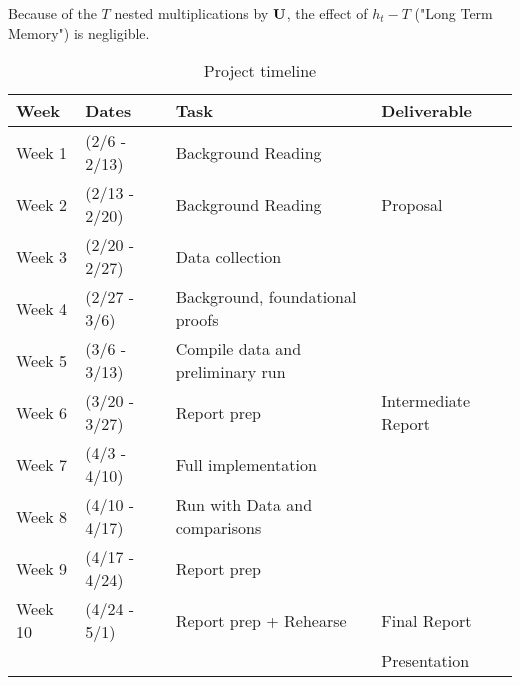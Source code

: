 Because of the $T$ nested multiplications by $\textbf U$, the effect of $h_t-T$ ("Long Term Memory") is negligible.

\begin{table*}[t]
  \caption{Project timeline}
  \label{tab:freq}
  \begin{tabular}{llll}
    \toprule
    Week & Dates & Task & Deliverable\\
    \midrule
    Week 1 & (2/6   - 2/13) & Background Reading & \\
    Week 2 & (2/13  - 2/20) & Background Reading & Proposal\\
    Week 3 & (2/20  - 2/27) & Data collection & \\
    Week 4 & (2/27  - 3/6)  & Background, foundational proofs & \\
    Week 5 & (3/6   - 3/13) & Compile data and preliminary run & \\
    Week 6 & (3/20  - 3/27) & Report prep & Intermediate Report\\
    Week 7 & (4/3   - 4/10) & Full implementation & \\
    Week 8 & (4/10  - 4/17) & Run with Data and comparisons & \\
    Week 9 & (4/17  - 4/24) & Report prep & \\
    Week 10 & (4/24 - 5/1) & Report prep + Rehearse & Final Report \\
    & & & Presentation\\
  \bottomrule
\end{tabular}
\end{table*}
